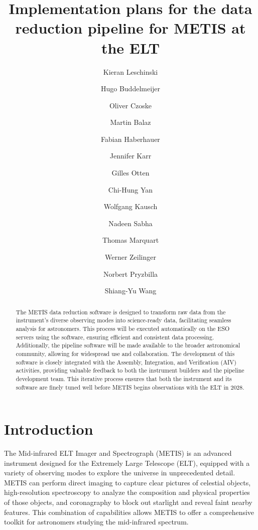 \documentclass[a4paper]{spie}  %
\title{Implementation plans for the data reduction pipeline for METIS at the ELT }
\author[a]{Kieran Leschinski}
\author[a]{Hugo Buddelmeijer}
\author[a]{Oliver Czoske}
\author[a]{Martin Balaz}
\author[a]{Fabian Haberhauer}
\author[a]{Jennifer Karr}
\author[a]{Gilles Otten}
\author[a]{Chi-Hung Yan}
\author[a]{Wolfgang Kausch}
\author[a]{Nadeen Sabha}
\author[a]{Thomas Marquart}
\author[a]{Werner Zeilinger}
\author[a]{Norbert Pryzbilla}
\author[a]{Shiang-Yu Wang}
\affil[a]{University of Vienna, T\"urkenschanztra\ss e 18, 1180 Vienna, Austria}
\begin{document}
 
\maketitle

\begin{abstract}
The METIS data reduction software is designed to transform raw data from the instrument's diverse observing modes into science-ready data, facilitating seamless analysis for astronomers. This process will be executed automatically on the ESO servers using the software, ensuring efficient and consistent data processing. Additionally, the pipeline software will be made available to the broader astronomical community, allowing for widespread use and collaboration. The development of this software is closely integrated with the Assembly, Integration, and Verification (AIV) activities, providing valuable feedback to both the instrument builders and the pipeline development team. This iterative process ensures that both the instrument and its software are finely tuned well before METIS begins observations with the ELT in 2028. 

\end{abstract}



\section{Introduction}
\label{sec:introduction}




The Mid-infrared ELT Imager and Spectrograph (METIS) is an advanced instrument designed for the Extremely Large Telescope (ELT), equipped with a variety of observing modes to explore the universe in unprecedented detail. METIS can perform direct imaging to capture clear pictures of celestial objects, high-resolution spectroscopy to analyze the composition and physical properties of those objects, and coronagraphy to block out starlight and reveal faint nearby features. This combination of capabilities allows METIS to offer a comprehensive toolkit for astronomers studying the mid-infrared spectrum.
\end{document}

